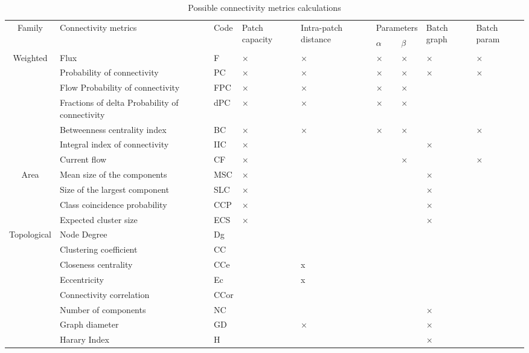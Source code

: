 \documentclass{article}
\begin{document}
\begin{table}[H]
\begin{tabular}{|c|p{5cm}|l|l|l|p{0.8cm}|p{0.8cm}|p{1cm}|p{1.3cm}|}
\hline
\multirow{2}{*}{Family} & \multirow{2}{*}{Connectivity metrics} & \multirow{2}{*}{Code} & \multirow{2}{*}{\parbox{1.3cm}{Patch capacity}} & \multirow{2}{*}{\parbox{1.3cm}{Intra-patch distance}}  & \multicolumn{2}{m{1.8cm}|}{\centering Parameters} & \multirow{2}{*}{\parbox{1.3cm}{Batch graph}} & \multirow{2}{*}{\parbox{1.3cm}{Batch param}}\\
\hhline{~~~~~--~~}
 & & & & & $\alpha$ & $\beta$ & & \\
\hline
\multirow{6}{*}{Weighted} 
 & Flux & F & × & × & × & × & × & ×\\
 & Probability of connectivity & PC & × & × & × & × & × & ×\\
 & Flow Probability of connectivity  & FPC & × & × & × & × &  &\\
 & Fractions of delta Probability of connectivity & dPC & × & × & × & × &  &\\
 & Betweenness centrality index & BC & × & × & × & × &  &×\\
 & Integral index of connectivity & IIC & × &  &  &  & × & \\
 & Current flow & CF & × &  &  & × &  & ×\\
\hline
\multirow{4}{*}{Area} 
 & Mean size of the components & MSC & × &  &  &  & × & \\
 & Size of the largest component & SLC & × &  &  &  & × & \\
 & Class coincidence probability & CCP & × &  &  &  & × & \\
 & Expected cluster size & ECS & × &  &  &  & × & \\
\hline
\multirow{9}{*}{Topological} 
 & Node Degree & Dg &  &  &  &  &  & \\
 & Clustering coefficient  & CC &  &  &  &  &  & \\
 & Closeness centrality & CCe &   & x &  &  &  & \\
 & Eccentricity & Ec &  & x &  &  &  & \\
 & Connectivity correlation & CCor &  &  &  &  &  & \\
 & Number of components & NC &  &  &  &  & × & \\
 & Graph diameter & GD &  & × &  &  & × & \\
 & Harary Index & H &  &  &  &  & × & \\
\hline
\end{tabular}
\caption{Possible connectivity metrics calculations}
\label{metric_poss}
\end{table}
\end{document}
